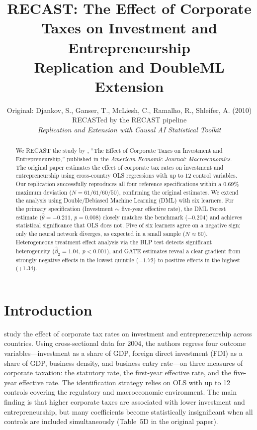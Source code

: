 \documentclass[12pt]{article}
\title{RECAST: The Effect of Corporate Taxes on Investment and Entrepreneurship\\[6pt]
  \large Replication and DoubleML Extension}
\author{Original: Djankov, S., Ganser, T., McLiesh, C., Ramalho, R., Shleifer, A. (2010)\\[3pt]
  \small RECASTed by the RECAST pipeline\\
  \small\textit{Replication and Extension with Causal AI Statistical Toolkit}}
\date{}
\begin{document}
\maketitle

\begin{abstract}
We RECAST the study by \citet{djankov2010}, ``The Effect of Corporate Taxes on Investment and Entrepreneurship,''
published in the \textit{American Economic Journal: Macroeconomics}.
The original paper estimates the effect of corporate tax rates on investment and
entrepreneurship using cross-country OLS regressions with up to 12 control variables.
Our replication successfully reproduces all four reference specifications within a
0.69\% maximum deviation ($N = 61/61/60/50$), confirming the original estimates.
We extend the analysis using Double/Debiased Machine Learning (DML) with six
learners. For the primary specification (Investment $\sim$ five-year effective rate),
the DML Forest estimate ($\hat\theta = -0.211$, $p = 0.008$) closely matches the
\citet{baiardi2024} benchmark ($-0.204$) and achieves statistical significance that
OLS does not. Five of six learners agree on a negative sign; only the neural network
diverges, as expected in a small sample ($N \approx 60$). Heterogeneous treatment
effect analysis via the BLP test detects significant heterogeneity ($\hat\beta_2 = 1.04$,
$p < 0.001$), and GATE estimates reveal a clear gradient from strongly negative
effects in the lowest quintile ($-1.72$) to positive effects in the highest ($+1.34$).
\end{abstract}

\section{Introduction}

\citet{djankov2010} study the effect of corporate tax rates on investment and
entrepreneurship across countries. Using cross-sectional data for 2004, the authors
regress four outcome variables---investment as a share of GDP, foreign direct
investment (FDI) as a share of GDP, business density, and business entry rate---on
three measures of corporate taxation: the statutory rate, the first-year effective
rate, and the five-year effective rate. The identification strategy relies on OLS
with up to 12 controls covering the regulatory and macroeconomic environment. The
main finding is that higher corporate taxes are associated with lower investment
and entrepreneurship, but many coefficients become statistically insignificant when
all controls are included simultaneously (Table~5D in the original paper).
\end{document}
